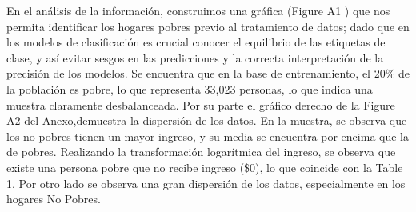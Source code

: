 \documentclass[11pt]{article}
\begin{document}


\begin{table}[!htbp] \centering 
  \caption{Estadísticas Descriptivas Variables Numéricas - Por Hogar} 
  \label{} 
\end{table} 

\justify 
En el análisis de la información, construimos una gráfica (Figure A1 ) que nos permita identificar los hogares pobres previo al tratamiento de datos; dado que en los modelos de clasificación es crucial conocer el equilibrio de las etiquetas de clase, y así evitar sesgos en las predicciones y la correcta interpretación de la precisión de los modelos. Se encuentra que en la base de entrenamiento, el 20\% de la población es pobre, lo que representa 33,023 personas, lo que indica una muestra claramente desbalanceada. Por su parte el gráfico derecho de la Figure A2  del Anexo,demuestra la dispersión de los datos. En la muestra, se observa que los no pobres tienen un mayor ingreso, y su media se encuentra por encima que la de pobres. Realizando la transformación logarítmica del ingreso, se observa que existe una persona pobre que no recibe ingreso (\$0), lo que coincide con la Table 1. Por otro lado se observa una gran dispersión de los datos, especialmente en los hogares No Pobres. 
\end{document}
